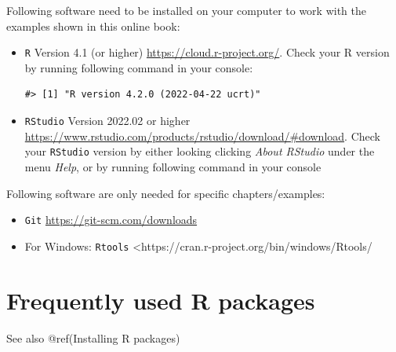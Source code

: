 \documentclass[
  letterpaper,
  DIV=11,
  numbers=noendperiod]{scrreprt}
\newenvironment{Shaded}{\begin{snugshade}}{\end{snugshade}}
\newcommand{\FunctionTok}[1]{\textcolor[rgb]{0.28,0.35,0.67}{#1}}
\newcommand{\NormalTok}[1]{\textcolor[rgb]{0.00,0.23,0.31}{#1}}
\newcommand{\SpecialCharTok}[1]{\textcolor[rgb]{0.37,0.37,0.37}{#1}}
\providecommand{\tightlist}{%
  \setlength{\itemsep}{0pt}\setlength{\parskip}{0pt}}\usepackage{longtable,booktabs,array}
\begin{document}
Following software need to be installed on your computer to work with
the examples shown in this online book:

\begin{itemize}
\item
  \texttt{R} Version 4.1 (or higher) \url{https://cloud.r-project.org/}.
  Check your R version by running following command in your console:

\begin{Shaded}
\end{Shaded}

\begin{verbatim}
#> [1] "R version 4.2.0 (2022-04-22 ucrt)"
\end{verbatim}
\item
  \texttt{RStudio} Version 2022.02 or higher
  \url{https://www.rstudio.com/products/rstudio/download/\#download}.
  Check your \texttt{RStudio} version by either looking clicking
  \emph{About RStudio} under the menu \emph{Help}, or by running
  following command in your console

\begin{Shaded}
\end{Shaded}
\end{itemize}

Following software are only needed for specific chapters/examples:

\begin{itemize}
\tightlist
\item
  \texttt{Git} \url{https://git-scm.com/downloads}
\item
  For Windows: \texttt{Rtools}
  \textless https://cran.r-project.org/bin/windows/Rtools/
\end{itemize}

\hypertarget{frequently-used-r-packages}{%
\section{Frequently used R packages}\label{frequently-used-r-packages}}

See also @ref(Installing R packages)
\end{document}
